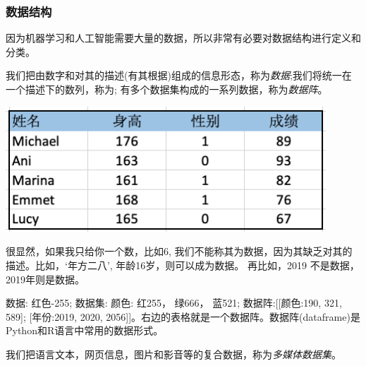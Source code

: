 \documentclass[12pt]{article}
\numberwithin{equation}{section}
\numberwithin{figure}{section}
\begin{document}
\subsubsection{数据结构}

因为机器学习和人工智能需要大量的数据，所以非常有必要对数据结构进行定义和分类。

\begin{definition}
	我们把由数字和对其的描述(有其根据)组成的信息形态，称为\textit{数据};我们将统一在一个描述下的数列，称为; 有多个数据集构成的一系列数据，称为\textit{数据阵}。
\end{definition}
\begin{marginfigure}
	\centering
	\includegraphics[width=0.9\textwidth]{fig/dataframeEx}
\end{marginfigure}
\begin{remark}
很显然，如果我只给你一个数，比如6, 我们不能称其为数据，因为其缺乏对其的描述。比如，`年方二八’, 年龄16岁，则可以成为数据。	再比如，2019 不是数据，2019年则是数据。
\end{remark}

\begin{example}
数据: 红色-255; 数据集: 颜色: 红255， 绿666， 蓝521; 数据阵:[[颜色:190, 321, 589]; [年份:2019, 2020, 2056]]。右边的表格就是一个数据阵。数据阵(dataframe)是Python和R语言中常用的数据形式。
\end{example}

\begin{definition}
	我们把语言文本，网页信息，图片和影音等的复合数据，称为\textit{多媒体数据集}。
\end{definition}
\end{document}
